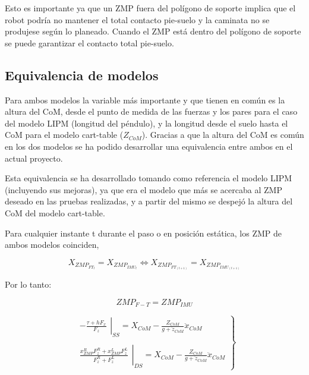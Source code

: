 Esto es importante ya que un ZMP fuera del polígono de soporte implica que el robot podría no mantener el total contacto pie-suelo y la caminata no se produjese según lo planeado. Cuando el ZMP está dentro del polígono de soporte se puede garantizar el contacto total pie-suelo.

\newpage

\subsection{Equivalencia de modelos}\label{equivalencia_modelos}

Para ambos modelos la variable más importante y que tienen en común es la altura del CoM, desde el punto de medida de las fuerzas y los pares para el caso del modelo LIPM (longitud del péndulo), y la longitud desde el suelo hasta el CoM para el modelo cart-table ($Z_{CoM}$). Gracias a que la altura del CoM es común en los dos modelos se ha podido desarrollar una equivalencia entre ambos en el actual proyecto.

Esta equivalencia se ha desarrollado tomando como referencia el modelo LIPM (incluyendo sus mejoras), ya que era el modelo que más se acercaba al ZMP deseado en las pruebas realizadas, y a partir del mismo se despejó la altura del CoM del modelo cart-table. 

Para cualquier instante t durante el paso o en posición estática, los ZMP de ambos modelos coinciden,

\begin{equation}
X_{ZMP_{FT_t}} = X_{ZMP_{IMU_t}} \Leftrightarrow   X_{ZMP_{FT_{(t+1)}}}=X_{ZMP_{IMU_{(t+1)}}}
\label{ec433}
\end{equation}

Por lo tanto:

\begin{equation}
ZMP_{F-T}=ZMP_{IMU}
\label{ec434}
\end{equation}

\begin{equation}
\left.\begin{matrix}
\left.\begin{matrix}
-\frac{\tau+ h F_{x}}{F_{z}}
\end{matrix}\right|_{SS}=X_{CoM}-\frac{Z_{CoM}}{g+\ddot{z}_{CoM}}\ddot{x}_{CoM}
\\ 
\\
\left.\begin{matrix}
\frac{x_{ZMP}^{R}F_{z}^{R}+x_{ZMP}^{L}F_{z}^{L}}{F_{z}^{R}+F_{z}^{L}}
\end{matrix}\right|_{DS}=X_{CoM}-\frac{Z_{CoM}}{g+\ddot{z}_{CoM}}\ddot{x}_{CoM}
\end{matrix}\right\}
\label{ec435}
\end{equation}

